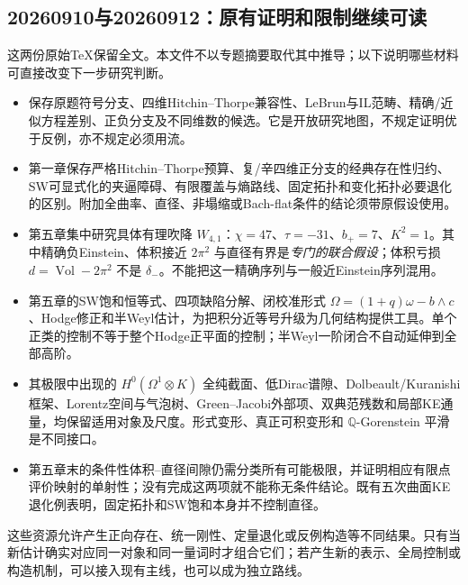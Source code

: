 \documentclass[UTF8,a4paper,11pt,fontset=fandol]{ctexart}
\numberwithin{equation}{section}
\theoremstyle{definition}
\newcommand{\Vol}{\operatorname{Vol}}
\begin{document}
\subsection{20260910与20260912：原有证明和限制继续可读}
这两份原始TeX保留全文。本文件不以专题摘要取代其中推导；以下说明哪些材料可直接改变下一步研究判断。
\begin{itemize}
\item {} 保存原题符号分支、四维Hitchin--Thorpe兼容性、LeBrun与IL范畴、精确/近似方程差别、正负分支及不同维数的候选。它是开放研究地图，不规定证明优于反例，亦不规定必须用流。
\item {} 第一章保存严格Hitchin--Thorpe预算、复/辛四维正分支的经典存在性归约、SW可显式化的夹逼障碍、有限覆盖与熵路线、固定拓扑和变化拓扑必要退化的区别。附加全曲率、直径、非塌缩或Bach-flat条件的结论须带原假设使用。
\item 第五章集中研究具体有理吹降 $W_{4,1}$：$\chi=47$、$\tau=-31$、$b_+=7$、$K^2=1$。其中精确负Einstein、体积接近 $2\pi^2$ 与直径有界是\emph{专门的联合假设}；体积亏损 $d=\Vol-2\pi^2$ 不是 $\delta_-$。不能把这一精确序列与一般近Einstein序列混用。
\item 第五章的SW饱和恒等式、四项缺陷分解、闭校准形式 $\Omega=(1+q)\omega-b\wedge c$、Hodge修正和半Weyl估计，为把积分近等号升级为几何结构提供工具。单个正类的控制不等于整个Hodge正平面的控制；半Weyl一阶闭合不自动延伸到全部高阶。
\item 其极限中出现的 $H^0(\Omega^1\otimes K)$ 全纯截面、低Dirac谱隙、Dolbeault/Kuranishi框架、Lorentz空间与气泡树、Green--Jacobi外部项、双典范残数和局部KE通量，均保留适用对象及尺度。形式变形、真正可积变形和 $\mathbb Q$-Gorenstein 平滑是不同接口。
\item 第五章末的条件性体积--直径间隙仍需分类所有可能极限，并证明相应有限点评价映射的单射性；没有完成这两项就不能称无条件结论。既有五次曲面KE退化例表明，固定拓扑和SW饱和本身并不控制直径。
\end{itemize}
这些资源允许产生正向存在、统一刚性、定量退化或反例构造等不同结果。只有当新估计确实对应同一对象和同一量词时才组合它们；若产生新的表示、全局控制或构造机制，可以接入现有主线，也可以成为独立路线。
\end{document}
